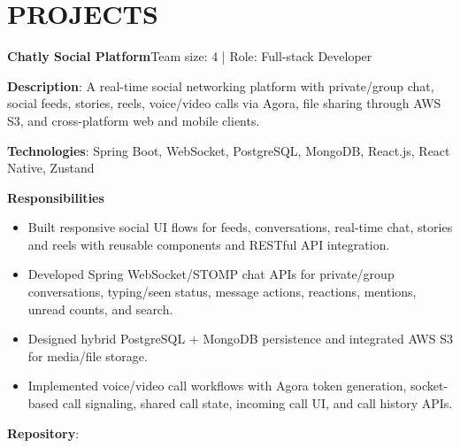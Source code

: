 \section{PROJECTS}
\resumeSubHeadingListStart

  \resumeProjectHeading
    {\textbf{Chatly Social Platform}}{Team size: 4 | Role: Full-stack Developer}
    \resumeItemListStart
      \item \textbf{Description}: A real-time social networking platform with private/group chat, social feeds, stories, reels,
        voice/video calls via Agora, file sharing through AWS S3, and cross-platform web and mobile clients.
      \item \textbf{Technologies}: Spring Boot, WebSocket, PostgreSQL, MongoDB, React.js, React Native, Zustand
      \item \textbf{Responsibilities}
        \begin{itemize}
          \item Built responsive social UI flows for feeds, conversations, real-time chat, stories and reels with reusable components and RESTful API integration.
          \item Developed Spring WebSocket/STOMP chat APIs for private/group conversations, typing/seen status, message actions, reactions, mentions, unread counts, and search.
          \item Designed hybrid PostgreSQL + MongoDB persistence and integrated AWS S3 for media/file storage.
          \item Implemented voice/video call workflows with Agora token generation, socket-based call signaling, shared call state, incoming call UI, and call history APIs.
        \end{itemize}
      \item \textbf{Repository}: \href{https://github.com/nvminh162/chatly-social-platform}{}
    \resumeItemListEnd

